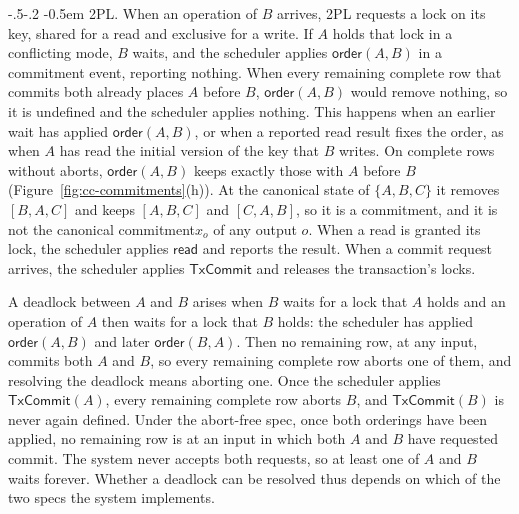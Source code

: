 \documentclass[sigconf]{cidr-2027}
\makeatletter
\theoremstyle{remark}
\renewcommand\paragraph{\@startsection{paragraph}{4}{\z@}%
  {-.5\baselineskip \@plus -2\p@ \@minus -.2\p@}%
  {-0.5em}%
  {\normalfont\bfseries}}
\newcommand{\commitment}{commitment\xspace}
\makeatother
\begin{document}
\paragraph{2PL.}
When an operation of $B$ arrives, 2PL requests a lock on its key, shared for a
read and exclusive for a write.  If $A$ holds that lock in a conflicting mode,
$B$ waits, and the scheduler applies $\mathsf{order}(A,B)$ in a \commitment
event, reporting nothing.  When every remaining complete row that commits
both already places $A$ before $B$, $\mathsf{order}(A,B)$ would remove
nothing, so it is undefined and the scheduler applies nothing.  This happens when an earlier wait has applied
$\mathsf{order}(A,B)$, or when a reported read result fixes the order, as when
$A$ has read the initial version of the key that $B$ writes.  On complete
rows without aborts,
$\mathsf{order}(A,B)$ keeps exactly those with $A$ before $B$
(Figure~\ref{fig:cc-commitments}(h)).  At the canonical state of $\{A,B,C\}$ it
removes $[B,A,C]$ and keeps $[A,B,C]$ and $[C,A,B]$, so it is a \commitment, and it
is not the canonical \commitment $x_o$ of any output $o$.  When a read is granted its lock,
the scheduler applies $\mathsf{read}$ and reports the result.  When a commit
request arrives, the scheduler applies $\mathsf{TxCommit}$ and releases the
transaction's locks.

A deadlock between $A$ and $B$ arises when $B$ waits for a lock that $A$ holds
and an operation of $A$ then waits for a lock that $B$ holds: the scheduler has
applied $\mathsf{order}(A,B)$ and later $\mathsf{order}(B,A)$.  Then no
remaining row, at any input, commits both $A$ and $B$, so every remaining
complete row aborts one of them, and resolving the deadlock means aborting one.
Once the scheduler applies $\mathsf{TxCommit}(A)$, every remaining complete row
aborts $B$, and $\mathsf{TxCommit}(B)$ is never again defined.  Under the
abort-free spec, once both orderings have been applied, no remaining
row is at an input in which both $A$ and $B$ have requested commit.  The system
never accepts both requests, so at least one of $A$ and $B$ waits forever.
Whether a deadlock can be resolved thus depends on which of the two
specs the system implements.
\end{document}
